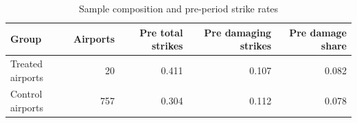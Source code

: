 \begin{table}[!htbp]\centering
\caption{Sample composition and pre-period strike rates}
\label{tab:summary}
\begin{tabular}{lrrrr}
\toprule
Group & Airports & Pre total strikes & Pre damaging strikes & Pre damage share \\
\midrule
Treated airports & 20 & 0.411 & 0.107 & 0.082 \\
Control airports & 757 & 0.304 & 0.112 & 0.078 \\
\bottomrule
\end{tabular}
\end{table}
